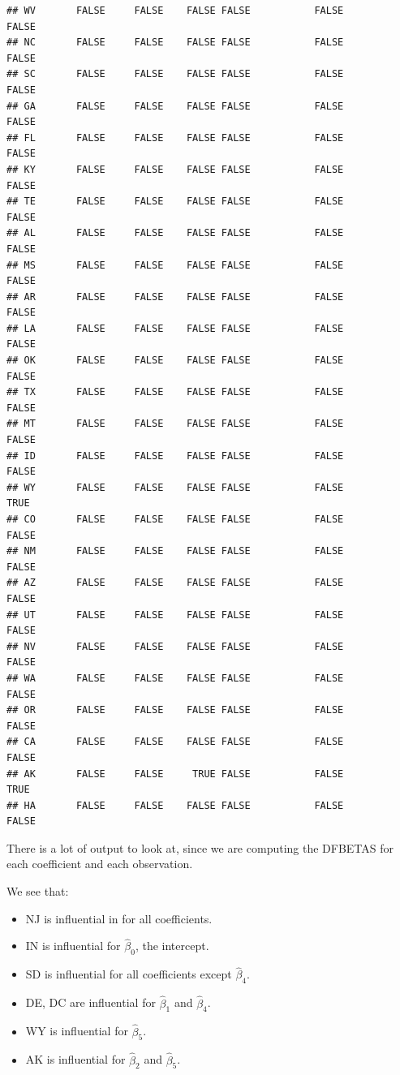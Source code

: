 \documentclass[
]{book}
\providecommand{\tightlist}{%
  \setlength{\itemsep}{0pt}\setlength{\parskip}{0pt}}
\begin{document}
\begin{verbatim}
## WV       FALSE     FALSE    FALSE FALSE           FALSE          FALSE
## NC       FALSE     FALSE    FALSE FALSE           FALSE          FALSE
## SC       FALSE     FALSE    FALSE FALSE           FALSE          FALSE
## GA       FALSE     FALSE    FALSE FALSE           FALSE          FALSE
## FL       FALSE     FALSE    FALSE FALSE           FALSE          FALSE
## KY       FALSE     FALSE    FALSE FALSE           FALSE          FALSE
## TE       FALSE     FALSE    FALSE FALSE           FALSE          FALSE
## AL       FALSE     FALSE    FALSE FALSE           FALSE          FALSE
## MS       FALSE     FALSE    FALSE FALSE           FALSE          FALSE
## AR       FALSE     FALSE    FALSE FALSE           FALSE          FALSE
## LA       FALSE     FALSE    FALSE FALSE           FALSE          FALSE
## OK       FALSE     FALSE    FALSE FALSE           FALSE          FALSE
## TX       FALSE     FALSE    FALSE FALSE           FALSE          FALSE
## MT       FALSE     FALSE    FALSE FALSE           FALSE          FALSE
## ID       FALSE     FALSE    FALSE FALSE           FALSE          FALSE
## WY       FALSE     FALSE    FALSE FALSE           FALSE           TRUE
## CO       FALSE     FALSE    FALSE FALSE           FALSE          FALSE
## NM       FALSE     FALSE    FALSE FALSE           FALSE          FALSE
## AZ       FALSE     FALSE    FALSE FALSE           FALSE          FALSE
## UT       FALSE     FALSE    FALSE FALSE           FALSE          FALSE
## NV       FALSE     FALSE    FALSE FALSE           FALSE          FALSE
## WA       FALSE     FALSE    FALSE FALSE           FALSE          FALSE
## OR       FALSE     FALSE    FALSE FALSE           FALSE          FALSE
## CA       FALSE     FALSE    FALSE FALSE           FALSE          FALSE
## AK       FALSE     FALSE     TRUE FALSE           FALSE           TRUE
## HA       FALSE     FALSE    FALSE FALSE           FALSE          FALSE
\end{verbatim}

There is a lot of output to look at, since we are computing the DFBETAS for each coefficient and each observation.

We see that:

\begin{itemize}
\tightlist
\item
  NJ is influential in for all coefficients.
\item
  IN is influential for \(\hat{\beta}_0\), the intercept.
\item
  SD is influential for all coefficients except \(\hat{\beta}_4\).
\item
  DE, DC are influential for \(\hat{\beta}_1\) and \(\hat{\beta}_4\).
\item
  WY is influential for \(\hat{\beta}_5\).
\item
  AK is influential for \(\hat{\beta}_2\) and \(\hat{\beta}_5\).
\end{itemize}
\end{document}
